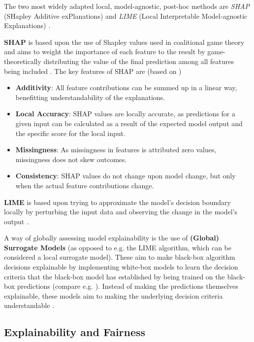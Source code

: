 The two most widely adapted local, model-agnostic, post-hoc methods are \textit{SHAP} (SHapley Additive exPlanations) \parencite{Lundberg2017} and \textit{LIME} (Local Interpretable Model-agnostic Explanations) \parencite{Ribeiro2016}.

\textbf{SHAP} is based upon the use of Shapley values used in coalitional game theory and aims to weight the importance of each feature to the result by game-theoretically distributing the value of the final prediction among all features being included \parencite{Molnar2023}.
The key features of SHAP are (based on \cite{Molnar2023})
\begin{itemize}
    \item \textbf{Additivity}: All feature contributions can be summed up in a linear way, benefitting understandability of the explanations.
    \item \textbf{Local Accuracy}: SHAP values are locally accurate, as predictions for a given input can be calculated as a result of the expected model output and the specific score for the local input.
    \item \textbf{Missingness}: As missingness in features is attributed zero values, missingness does not skew outcomes.
    \item \textbf{Consistency}: SHAP values do not change upon model change, but only when the actual feature contributions change.
\end{itemize}

\textbf{LIME} is based upon trying to approximate the model's decision boundary locally by perturbing the input data and observing the change in the model's output \parencite{Molnar2023}.

A way of globally assessing model explainability is the use of \textbf{(Global) Surrogate Models} (as opposed to e.g. the LIME algorithm, which can be considered a local surrogate model). 
These aim to make black-box algorithm decisions explainable by implementing white-box models to learn the decision criteria that the black-box model has established by being trained on the black-box predictions (compare e.g. \cite{Karim2023}).
Instead of making the predictions themselves explainable, these models aim to making the underlying decision criteria understandable \parencite{Molnar2023}.

\subsection{Explainability and Fairness}\label{subsec:Explainability_fairness}

